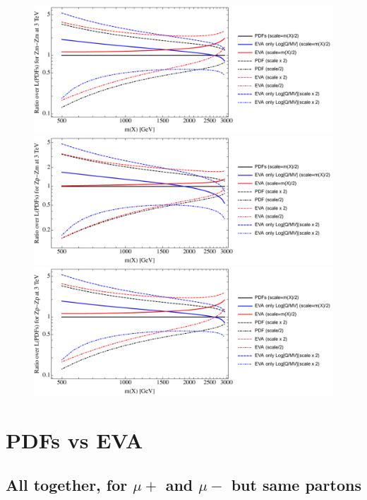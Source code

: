 \documentclass[a4paper,11pt]{article}
\begin{document}
\begin{figure}[ht]
\includegraphics[width=0.46\linewidth]{Notebooks/PlotLumi/3TeV/ratios/Zm-Zm.pdf}
\includegraphics[width=0.46\linewidth]{Notebooks/PlotLumi/3TeV/ratios/Zp-Zm.pdf}
\includegraphics[width=0.46\linewidth]{Notebooks/PlotLumi/3TeV/ratios/Zp-Zp.pdf}
\end{figure}



\clearpage
\section{PDFs vs EVA}

\subsection{All together, for $\mu+$ and $\mu-$ but same partons}
\end{document}
